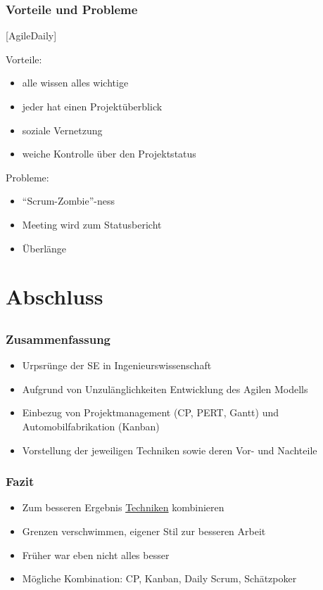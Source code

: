\documentclass[%
	handout
]{beamer}
\newcommand{\daily}{[AgileDaily]}
\begin{document}
		\begin{frame}
			\frametitle{Vorteile und Probleme}
			\daily\\
			\begin{minipage}[t]{.48\textwidth}
				Vorteile:
				\begin{itemize}
					\item alle wissen alles wichtige
					\item jeder hat einen Projektüberblick
					\item soziale Vernetzung
					\item weiche Kontrolle über den Projektstatus
				\end{itemize}
			\end{minipage}
			\pause
			\begin{minipage}[t]{.48\textwidth}
				Probleme:
				\begin{itemize}
					\item ``Scrum-Zombie''-ness
					\item Meeting wird zum Statusbericht
					\item Überlänge
				\end{itemize}
			\end{minipage}
		\end{frame}
		
\section{Abschluss}
	\subsection{}
		\begin{frame}
			\frametitle{Zusammenfassung}
			\begin{itemize}
				\item Urpsrünge der SE in Ingenieurswissenschaft
				\item Aufgrund von Unzulänglichkeiten Entwicklung des Agilen Modells
				\item Einbezug von Projektmanagement (CP, PERT, Gantt) und Automobilfabrikation (Kanban)
				\item Vorstellung der jeweiligen Techniken sowie deren Vor- und Nachteile
			\end{itemize}
		\end{frame}
		\begin{frame}
			\frametitle{Fazit}
			\begin{itemize}
				\item Zum besseren Ergebnis \href{https://www.agilealliance.org/agile101/subway-map-to-agile-practices/}{Techniken} kombinieren
				\item Grenzen verschwimmen, eigener Stil zur besseren Arbeit
				\item Früher war eben nicht alles besser
				\item Mögliche Kombination: CP, Kanban, Daily Scrum, Schätzpoker
			\end{itemize}
		\end{frame}
		
\end{document}
